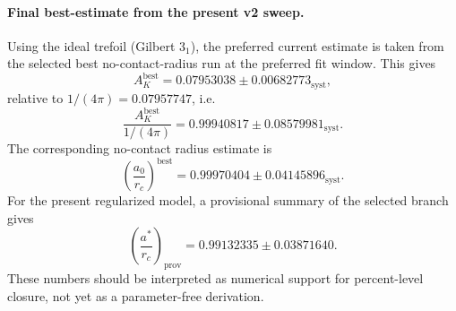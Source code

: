 \paragraph{Final best-estimate from the present v2 sweep.}
Using the ideal trefoil (Gilbert $3_1$), the preferred current estimate is taken from the selected best no-contact-radius run at the preferred fit window. This gives\n\[
A_K^{\mathrm{best}} = 0.07953038 \pm 0.00682773_{\mathrm{syst}},
\]
relative to $1/(4\pi)=0.07957747$, i.e.\n\[
\frac{A_K^{\mathrm{best}}}{1/(4\pi)} = 0.99940817 \pm 0.08579981_{\mathrm{syst}}.
\]
The corresponding no-contact radius estimate is\n\[
\left(\frac{a_0}{r_c}\right)^{\mathrm{best}} = 0.99970404 \pm 0.04145896_{\mathrm{syst}}.
\]
For the present regularized model, a provisional summary of the selected branch gives\n\[
\left(\frac{a^*}{r_c}\right)_{\mathrm{prov}} = 0.99132335 \pm 0.03871640.
\]
These numbers should be interpreted as numerical support for percent-level closure, not yet as a parameter-free derivation.
